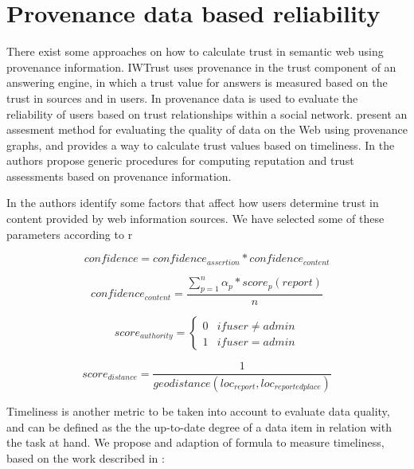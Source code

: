 \section{Provenance data based reliability}
\label{sec:provenance}

There exist some approaches on how to calculate trust in semantic web using provenance information. IWTrust \cite{zaihrayeu2005iwtrust} uses provenance in the trust component of an answering engine, in which a trust value for answers is measured based on the trust in sources and in users. In \cite{golbeck2006combining} provenance data is used to evaluate the reliability of users based on trust relationships within a social network. \cite{Hartig09usingweb} present an assesment method for evaluating the quality of data on the Web using provenance graphs, and provides a way to calculate trust values based on timeliness. In \cite{CeolinGHNF12} the authors propose generic procedures for computing reputation and trust assessments based on provenance information.

In \cite{gil2007towards} the authors identify some factors that affect how users determine trust in content provided by web information sources. We have selected some of these parameters according to r


\begin{equation}
confidence = confidence_{assertion} * confidence_{content}
\end{equation}

\begin{equation}
confidence_{content} = \frac{\sum_{p=1}^{n} \alpha_p * score_p(report)}{n}
\end{equation}

\begin{equation}
score_{authority} = \left\{\begin{matrix}
0 & if user \neq admin \\
1 & if user = admin
\end{matrix}\right.
\end{equation}

\begin{equation}
score_{distance} = \frac{1}{geodistance(loc_{report}, loc_{reportedplace})}
\end{equation}


Timeliness is another metric to be taken into account to evaluate data quality, and can be defined as the the up-to-date degree of a data item in relation with the task at hand. We propose and adaption of \cite{Hartig09usingweb} formula to measure timeliness, based on the work described in \cite{Ballou:1998:MIM:291329.291335}:

